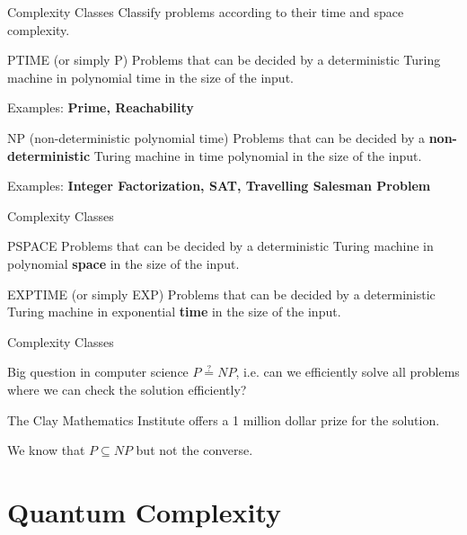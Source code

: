 \documentclass[c]{beamer}
\begin{document}
\begin{frame}{Complexity Classes}
    Classify problems according to their time and space complexity.
	\begin{block}{PTIME (or simply P)}
		Problems that can be decided by a deterministic Turing machine in polynomial time in the size of the input.
    \end{block}
    Examples: \textbf{Prime, Reachability}
    \begin{block}{NP (non-deterministic polynomial time)}
		Problems that can be decided by a \textbf{non-deterministic} Turing machine in time polynomial in the size of the input.
    \end{block}
    Examples: \textbf{Integer Factorization, SAT, Travelling Salesman Problem}
\end{frame}

\begin{frame}{Complexity Classes}
    \begin{block}{PSPACE}
		Problems that can be decided by a deterministic Turing machine in polynomial \textbf{space} in the size of the input.
    \end{block}
    \begin{block}{EXPTIME (or simply EXP)}
		Problems that can be decided by a deterministic Turing machine in exponential \textbf{time} in the size of the input.
    \end{block}
\end{frame}

\begin{frame}{Complexity Classes}
 
 \begin{block}{Big question in computer science}
 	$P\stackrel{?}{=}NP$, i.e. can we efficiently solve all problems where we can check the solution efficiently?
 \end{block}
 The Clay Mathematics Institute offers a 1 million dollar prize for the solution.
 
 We know that $ P \subseteq NP$ but not the converse. 
\end{frame}

\section{Quantum Complexity}
\end{document}
